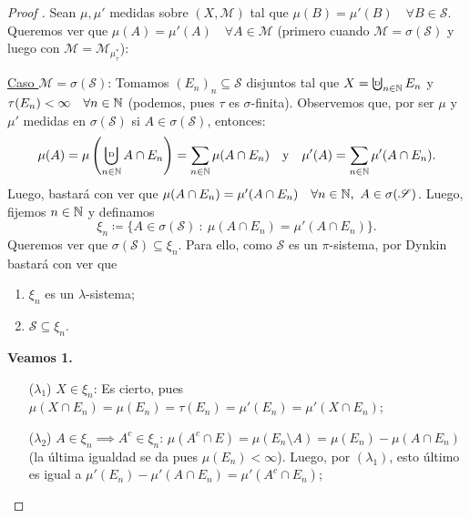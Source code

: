 \begin{proof}[Proof ]
	Sean $\mu,\mu'$ medidas sobre $(X, \mathscr{M})$ tal que $\mu(B) = \mu'(B) \quad \forall B \in \mathscr{S}$. Queremos ver que $\mu(A) = \mu'(A) \quad \forall A \in \mathscr{M}$ (primero cuando $\mathscr{M} = \sigma(\mathscr{S})$ y luego con $\mathscr{M} = \mathscr{M}_{\mu^{*}_{\tau}}$): \par
	\smallskip
	\underline{Caso $\mathscr{M} = \sigma(\mathscr{S})$}: Tomamos $(E_n)_n \subseteq \mathscr{S}$ disjuntos tal que $X = \textbigcupd_{n\in\N} E_n$ y $\tau(E_n) < \infty \quad \forall n\in\mathbb{N}$ (podemos, pues $\tau$ es $\sigma$-finita). Observemos que, por ser $\mu$ y $\mu'$ medidas en $\sigma(\mathscr{S})$ si $A \in \sigma(\mathscr{S})$, entonces:
	\[ \mu(A) = \mu \left( \bigcupd_{n\in\N} A \cap E_n \right) = \sum_{n\in\N} \mu(A \cap E_n) \quad \text{y} \quad \mu'(A) = \sum_{n\in\N} \mu'(A \cap E_n). \]
	Luego, bastará con ver que $\mu(A \cap E_n) = \mu'(A \cap E_n) \quad \forall n \in \mathbb{N},\ A \in \sigma(\mathscr{S})$. Luego, fijemos $n\in\mathbb{N}$ y definamos
	\[ \xi_n \coloneq \{A \in \sigma(\mathscr{S}) \ : \ \mu(A \cap E_n) = \mu'(A \cap E_n)\}. \]
	Queremos ver que $\sigma(\mathscr{S}) \subseteq \xi_n$. Para ello, como $\mathscr{S}$ es un $\pi$-sistema, por Dynkin bastará con ver que
	\begin{enumerate}
		\item $\xi_n$ es un $\lambda$-sistema;

		\item $\mathscr{S} \subseteq \xi_n$.
	\end{enumerate}
	\textbf{Veamos 1.}
	\begin{enumerate}
		\item[($\lambda_{1}$)] $X \in \xi_n$: Es cierto, pues $\mu(X \cap E_n) = \mu(E_n) = \tau(E_n) = \mu'(E_n) = \mu'(X \cap E_n)$;

		\item[($\lambda_{2}$)] $A \in \xi_n \implies A^c \in \xi_n$: $\mu(A^c \cap E) = \mu(E_n \setminus A) = \mu(E_n) - \mu(A \cap E_n)$ (la última igualdad se da pues $\mu(E_n) < \infty$). Luego, por $(\lambda_{1})$, esto último es igual a $\mu'(E_n) - \mu'(A \cap E_n) = \mu'(A^c \cap E_n)$;


\end{enumerate}
\end{proof}
